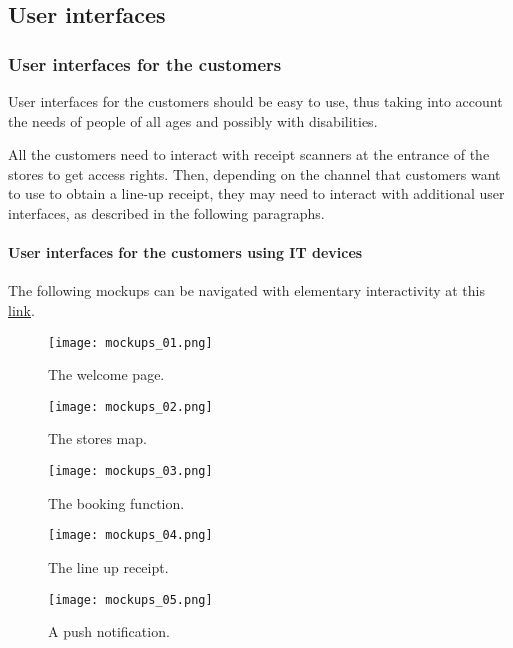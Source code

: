 \documentclass[../../main.tex]{subfiles}
\begin{document}
\subsection{User interfaces}

  \subsubsection{User interfaces for the customers}

  User interfaces for the customers should be easy to use, thus taking into
  account the needs of people of all ages and possibly with disabilities.

  All the customers need to interact with receipt scanners at the entrance of
  the stores to get access rights. Then, depending on
  the channel that customers want to use to obtain a line-up receipt, they may
  need to interact with additional user interfaces, as described in the
  following paragraphs.

  \paragraph{User interfaces for the customers using IT devices}

  The following mockups can be navigated with elementary interactivity at this \href{https://app.moqups.com/GnQbxBHNrI/view/page/ad64222d5?ui=0}{link}.

  \begin{figure}[H]
    \centering
    \texttt{[image: mockups\_01.png]}
    \caption{The welcome page.}
  \end{figure}

  \begin{figure}[H]
    \centering
    \texttt{[image: mockups\_02.png]}
    \caption{The stores map.}
  \end{figure}

  \begin{figure}[H]
    \centering
    \texttt{[image: mockups\_03.png]}
    \caption{The booking function.}
  \end{figure}

  \begin{figure}[H]
    \centering
    \texttt{[image: mockups\_04.png]}
    \caption{The line up receipt.}
  \end{figure}

  \begin{figure}[H]
    \centering
    \texttt{[image: mockups\_05.png]}
    \caption{A push notification.}
  \end{figure}
\end{document}
